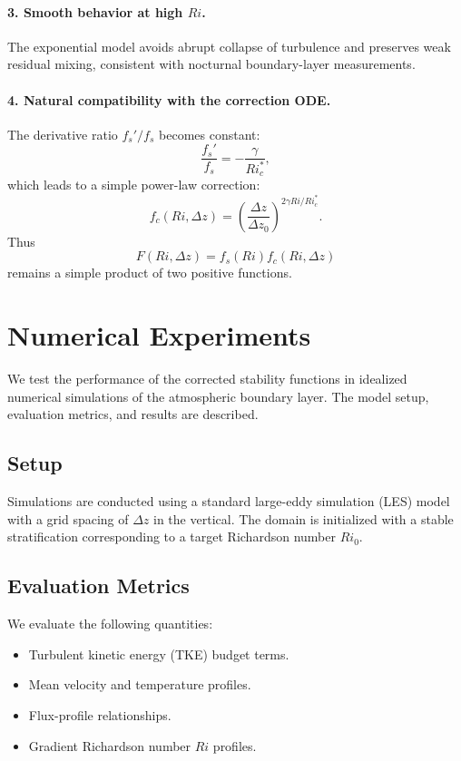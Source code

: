 \documentclass[12pt]{article}
\begin{document}
\paragraph{3. Smooth behavior at high \(Ri\).} The exponential model avoids abrupt collapse of turbulence and preserves weak residual mixing, consistent with nocturnal boundary-layer measurements.

\paragraph{4. Natural compatibility with the correction ODE.} The derivative ratio \(f_s'/f_s\) becomes constant:
\[
    \frac{f_s'}{f_s} = -\frac{\gamma}{Ri_c^*},
\]
which leads to a simple power-law correction:
\begin{equation}
    f_c(Ri,\Delta z) = \left(\frac{\Delta z}{\Delta z_0}\right)^{2 \gamma Ri / Ri_c^*}.
\end{equation}
Thus
\begin{equation}
    F(Ri,\Delta z) = f_s(Ri) f_c(Ri,\Delta z)
\end{equation}
remains a simple product of two positive functions.

\section{Numerical Experiments}

We test the performance of the corrected stability functions in idealized numerical simulations of the atmospheric boundary layer. The model setup, evaluation metrics, and results are described.

\subsection{Setup}

Simulations are conducted using a standard large-eddy simulation (LES) model with a grid spacing of \(\Delta z\) in the vertical. The domain is initialized with a stable stratification corresponding to a target Richardson number \(Ri_0\).

\subsection{Evaluation Metrics}

We evaluate the following quantities:
\begin{itemize}
    \item Turbulent kinetic energy (TKE) budget terms.
    \item Mean velocity and temperature profiles.
    \item Flux-profile relationships.
    \item Gradient Richardson number \(Ri\) profiles.
\end{itemize}
\end{document}
